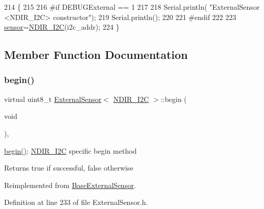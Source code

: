 \begin{DoxyCode}
214     \{
215     
216 \textcolor{preprocessor}{    #if DEBUGExternal == 1 }
217 
218         Serial.println( \textcolor{stringliteral}{"ExternalSensor <NDIR\_I2C> constructor"});
219         Serial.println();
220     
221 \textcolor{preprocessor}{    #endif}
222 
223         \hyperlink{class_external_sensor_3_01_n_d_i_r___i2_c_01_4_ae541c9cece7c38674b70114cdb74a7dc}{sensor}=\hyperlink{class_n_d_i_r___i2_c}{NDIR\_I2C}(i2c\_addr);
224     \}
\end{DoxyCode}


\subsection{Member Function Documentation}
\mbox{\label{class_external_sensor_3_01_n_d_i_r___i2_c_01_4_ac6f3614d94968ef0cc11b2b4d69cef03}} 
\subsubsection{\texorpdfstring{begin()}{begin()}}
{\footnotesize\ttfamily virtual uint8\+\_\+t \hyperlink{class_external_sensor}{External\+Sensor}$<$ \hyperlink{class_n_d_i_r___i2_c}{N\+D\+I\+R\+\_\+\+I2C} $>$\+::begin (\begin{DoxyParamCaption}\item[{void}]{ }\end{DoxyParamCaption})\hspace{0.3cm}{\ttfamily [inline]}, {\ttfamily [virtual]}}

\hyperlink{class_external_sensor_3_01_n_d_i_r___i2_c_01_4_ac6f3614d94968ef0cc11b2b4d69cef03}{begin()}\+: \hyperlink{class_n_d_i_r___i2_c}{N\+D\+I\+R\+\_\+\+I2C} specific begin method

\begin{DoxyReturn}{Returns}
true if successful, false otherwise 
\end{DoxyReturn}


Reimplemented from \hyperlink{class_base_external_sensor_a87d132803d4f4fdd4e66332809f0c9a0}{Base\+External\+Sensor}.



Definition at line 233 of file External\+Sensor.\+h.


